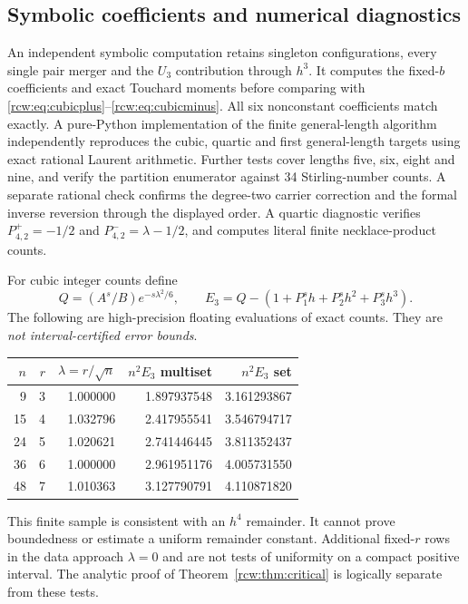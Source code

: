 \documentclass[11pt]{article}
\theoremstyle{definition}\newtheorem{definition}[theorem]{Definition}
\theoremstyle{remark}\newtheorem{remark}[theorem]{Remark}
\numberwithin{equation}{section}
\begin{document}
\subsection{Symbolic coefficients and numerical diagnostics}
An independent symbolic computation retains singleton configurations, every single pair merger and the $U_3$ contribution through $h^3$. It computes the fixed-$b$ coefficients and exact Touchard moments before comparing with \eqref{rcw:eq:cubicplus}--\eqref{rcw:eq:cubicminus}. All six nonconstant coefficients match exactly. A pure-Python implementation of the finite general-length algorithm independently reproduces the cubic, quartic and first general-length targets using exact rational Laurent arithmetic. Further tests cover lengths five, six, eight and nine, and verify the partition enumerator against 34 Stirling-number counts. A separate rational check confirms the degree-two carrier correction and the formal inverse reversion through the displayed order. A quartic diagnostic verifies $P^+_{4,2}=-1/2$ and $P^-_{4,2}=\lambda-1/2$, and computes literal finite necklace-product counts.

For cubic integer counts define
\[
 Q=(A^s/B)e^{-s\lambda^2/6},\qquad
 E_3=Q-(1+P_1^sh+P_2^sh^2+P_3^sh^3).
\]
The following are high-precision floating evaluations of exact counts. They are \emph{not interval-certified error bounds}.
\begin{center}
\begin{tabular}{rrrrr}
\toprule
$n$ & $r$ & $\lambda=r/\sqrt n$ & $n^2E_3$ multiset & $n^2E_3$ set\\
\midrule
9 & 3 & 1.000000 & 1.897937548 & 3.161293867\\
15 & 4 & 1.032796 & 2.417955541 & 3.546794717\\
24 & 5 & 1.020621 & 2.741446445 & 3.811352437\\
36 & 6 & 1.000000 & 2.961951176 & 4.005731550\\
48 & 7 & 1.010363 & 3.127790791 & 4.110871820\\
\bottomrule
\end{tabular}
\end{center}
This finite sample is consistent with an $h^4$ remainder. It cannot prove boundedness or estimate a uniform remainder constant. Additional fixed-$r$ rows in the data approach $\lambda=0$ and are not tests of uniformity on a compact positive interval. The analytic proof of Theorem~\ref{rcw:thm:critical} is logically separate from these tests.
\end{document}
